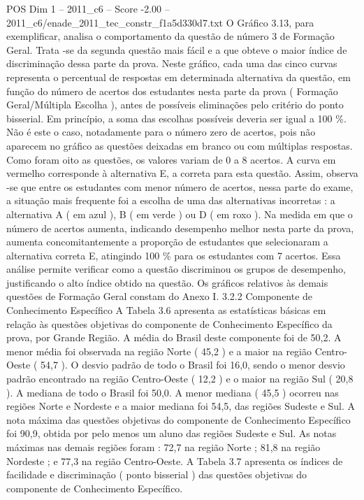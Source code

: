 \begin{textsample}{POS Dim 1 – 2011\_c6 – Score -2.00 – 2011\_c6/enade\_2011\_tec\_constr\_f1a5d330d7.txt}
O Gráfico 3.13, para exemplificar, analisa o comportamento da questão de número 3 de Formação Geral.
Trata -se da segunda questão mais fácil e a que obteve o maior índice de discriminação dessa parte da prova.
Neste gráfico, cada uma das cinco curvas representa o percentual de respostas em determinada alternativa da questão, em função do número de acertos dos estudantes nesta parte da prova ( Formação Geral/Múltipla Escolha ), antes de possíveis eliminações pelo critério do ponto bisserial.
Em princípio, a soma das escolhas possíveis deveria ser igual a 100 \%.
Não é este o caso, notadamente para o número zero de acertos, pois não aparecem no gráfico as questões deixadas em branco ou com múltiplas respostas.
Como foram oito as questões, os valores variam de 0 a 8 acertos.
A curva em vermelho corresponde à alternativa E, a correta para esta questão.
Assim, observa -se que entre os estudantes com menor número de acertos, nessa parte do exame, a situação mais frequente foi a escolha de uma das alternativas incorretas : a alternativa A ( em azul ), B ( em verde ) ou D ( em roxo ).
Na medida em que o número de acertos aumenta, indicando desempenho melhor nesta parte da prova, aumenta concomitantemente a proporção de estudantes que selecionaram a alternativa correta E, atingindo 100 \% para os estudantes com 7 acertos.
Essa análise permite verificar como a questão discriminou os grupos de desempenho, justificando o alto índice obtido na questão.
Os gráficos relativos às demais questões de Formação Geral constam do Anexo I. 3.2.2 Componente de Conhecimento Específico A Tabela 3.6 apresenta as estatísticas básicas em relação às questões objetivas do componente de Conhecimento Específico da prova, por Grande Região.
A média do Brasil deste componente foi de 50,2.
A menor média foi observada na região Norte ( 45,2 ) e a maior na região Centro-Oeste ( 54,7 ).
O desvio padrão de todo o Brasil foi 16,0, sendo o menor desvio padrão encontrado na região Centro-Oeste ( 12,2 ) e o maior na região Sul ( 20,8 ).
A mediana de todo o Brasil foi 50,0.
A menor mediana ( 45,5 ) ocorreu nas regiões Norte e Nordeste e a maior mediana foi 54,5, das regiões Sudeste e Sul.
A nota máxima das questões objetivas do componente de Conhecimento Específico foi 90,9, obtida por pelo menos um aluno das regiões Sudeste e Sul.
As notas máximas nas demais regiões foram : 72,7 na região Norte ; 81,8 na região Nordeste ; e 77,3 na região Centro-Oeste.
A Tabela 3.7 apresenta os índices de facilidade e discriminação ( ponto bisserial ) das questões objetivas do componente de Conhecimento Específico.

\end{textsample}
